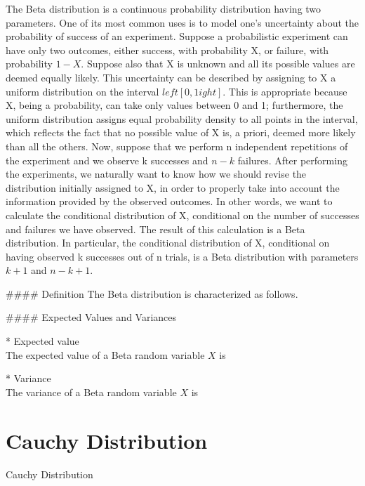The Beta distribution is a continuous probability distribution having two parameters. One of its most common uses is to model one's uncertainty about the probability of success of an experiment.
Suppose a probabilistic experiment can have only two outcomes, either success, with probability  X, or failure, with probability  $1-X$. Suppose also that  X is unknown and all its possible values are deemed equally likely. This uncertainty can be described by assigning to  X a uniform distribution on the interval  $left[ 0,1
ight] $. This is appropriate because  X, being a probability, can take only values between  0 and  1; furthermore, the uniform distribution assigns equal probability density to all points in the interval, which reflects the fact that no possible value of  X is, a priori, deemed more likely than all the others. Now, suppose that we perform  n independent repetitions of the experiment and we observe  k successes and  $n-k$ failures. After performing the experiments, we naturally want to know how we should revise the distribution initially assigned to  X, in order to properly take into account the information provided by the observed outcomes. In other words, we want to calculate the conditional distribution of  X, conditional on the number of successes and failures we have observed. The result of this calculation is a Beta distribution. In particular, the conditional distribution of  X, conditional on having observed  k successes out of  n trials, is a Beta distribution with parameters  $k+1$ and  $n-k+1$.

#### {Definition}
The Beta distribution is characterized as follows.


#### {Expected Values and Variances}

* Expected value\\
The expected value of a Beta random variable $X$ is

* Variance\\
The variance of a Beta random variable $X$ is

\section{Cauchy Distribution}
% 
Cauchy Distribution

